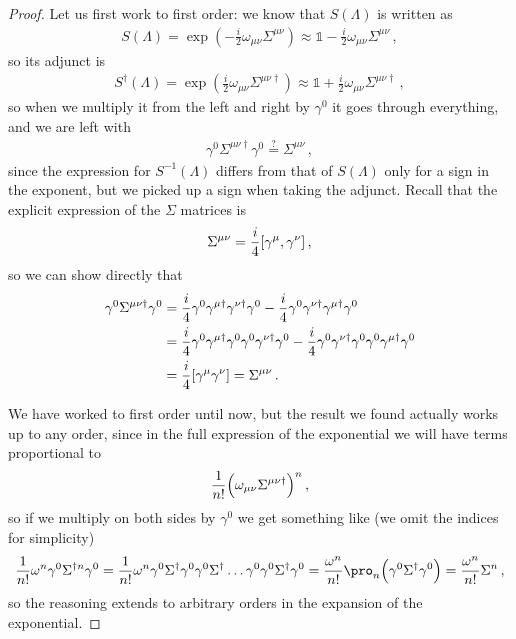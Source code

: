 \documentclass[main.tex]{subfiles}
\begin{document}
\begin{proof}
Let us first work to first order: 
we know that \(S(\Lambda )\) is written as 
%
\begin{align}
S(\Lambda )=   \exp( -\frac{i}{2} \omega_{\mu \nu } \Sigma^{\mu \nu })
\approx \mathbb{1} - \frac{i}{2} \omega_{\mu \nu } \Sigma^{\mu \nu }
\,,
\end{align}
%
so its adjunct is 
%
\begin{align}
S ^\dag (\Lambda ) = \exp( \frac{i}{2} \omega_{\mu \nu } \Sigma^{\mu \nu \dag}) \approx \mathbb{1} + \frac{i}{2} \omega_{\mu \nu } \Sigma^{\mu \nu \dag}
\,,
\end{align}
%
so when we multiply it from the left and right by \(\gamma^{0}\) it goes through everything, and we are left with 
%
\begin{align}
\gamma^{0} \Sigma^{\mu \nu \dag} \gamma^{0} \overset{?}{=} 
\Sigma^{\mu \nu }
\,,
\end{align}
%
since the expression for \(S^{-1}(\Lambda )\) differs from that of \(S(\Lambda )\) only for a sign in the exponent, but we picked up a sign when taking the adjunct. 
Recall that the explicit expression of the \(\Sigma \) matrices is 
%
\begin{align}
\Sigma^{\mu \nu } = \frac{i}{4} \qty[\gamma^{\mu }, \gamma^{\nu }]
\,,
\end{align}
%
so we can show directly that 
%
\begin{subequations}
\begin{align}
\gamma^{0} \Sigma^{\mu \nu \dag} \gamma^{0} &=
\frac{i}{4} \gamma^{0} \gamma^{\mu \dag}  \gamma^{\nu\dag } \gamma^{0 }
-\frac{i}{4} \gamma^{0} \gamma^{\nu\dag }  \gamma^{\mu \dag} \gamma^{0 } \\
&= 
\frac{i}{4} \gamma^{0} \gamma^{\mu \dag} \gamma^{0} \gamma^{0} \gamma^{\nu\dag } \gamma^{0 }
-\frac{i}{4} \gamma^{0} \gamma^{\nu\dag }  \gamma^{0} \gamma^{0} \gamma^{\mu \dag} \gamma^{0 }  \\
&= \frac{i}{4} \qty[\gamma^{\mu } \gamma^{\nu }] = \Sigma^{\mu \nu }
\,.
\end{align}
\end{subequations}

We have worked to first order until now, but the result we found actually works up to any order, since in the full expression of the exponential we will have terms proportional to 
%
\begin{align}
\frac{1}{n!} \qty(\omega_{\mu \nu } \Sigma^{\mu \nu \dag})^{n}
\,,
\end{align}
%
so if we multiply on both sides by \(\gamma^{0}\) we get something like (we omit the indices for simplicity) 
%
\begin{align}
\frac{1}{n!} \omega^{n} \gamma^{0} \Sigma^{\dag n} \gamma^{0} = 
\frac{1}{n!} \omega^{n} \gamma^{0} \Sigma^\dag \gamma^{0} \gamma^{0} \Sigma^\dag  \dots \gamma^{0} \gamma^{0} \Sigma^\dag \gamma^{0} =
\frac{\omega^{n}}{n!}\pro_{n} \qty(\gamma^{0} \Sigma^{\dag} \gamma^{0}) 
= \frac{\omega^{n}}{n!} \Sigma^{n}
\,,
\end{align}
%
so the reasoning extends to arbitrary orders in the expansion of the exponential. 
\end{proof}
\end{document}

